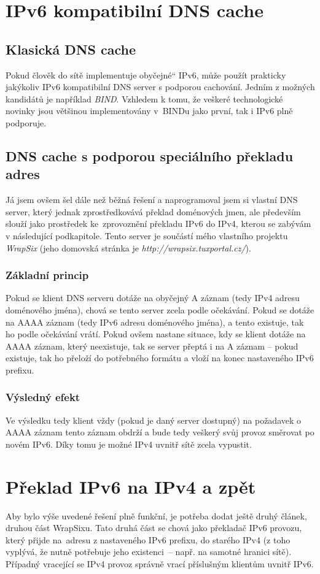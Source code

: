 \documentclass[12pt]{report}
\newcommand\uv[1]{\quotedblbase #1\textquotedblleft}
\begin{document}
\section{IPv6 kompatibilní DNS cache}
\subsection{Klasická DNS cache}
Pokud člověk do sítě implementuje \uv{obyčejné} IPv6, může použít prakticky jakýkoliv IPv6 kompatibilní DNS server s podporou cachování. Jedním z možných kandidátů je například \textit{BIND}. Vzhledem k tomu, že veškeré technologické novinky jsou většinou implementovány v~BINDu jako první, tak i IPv6 plně podporuje.

\subsection{DNS cache s podporou speciálního překladu adres}
Já jsem ovšem šel dále než běžná řešení a naprogramoval jsem si vlastní DNS server, který jednak zprostředkovává překlad doménových jmen, ale především slouží jako prostředek ke~zprovoznění překladu IPv6 do IPv4, kterou se zabývám v následující podkapitole. Tento server je součástí mého vlastního projektu \textit{WrapSix} (jeho domovská stránka je \textit{http://wrapsix.tuxportal.cz/}).

\subsubsection{Základní princip}
Pokud se klient DNS serveru dotáže na obyčejný A záznam (tedy IPv4 adresu doménového jména), chová se tento server zcela podle očekávání. Pokud se dotáže na AAAA záznam (tedy IPv6 adresu doménového jména), a tento existuje, tak ho podle očekávání vrátí. Pokud ovšem nastane situace, kdy se klient dotáže na AAAA záznam, který neexistuje, tak se server přeptá i na A záznam -- pokud existuje, tak ho přeloží do potřebného formátu a vloží na konec nastaveného IPv6 prefixu.

\subsubsection{Výsledný efekt}
Ve výsledku tedy klient vždy (pokud je daný server dostupný) na požadavek o AAAA záznam tento záznam obdrží a bude tedy veškerý svůj provoz směrovat po novém IPv6. Díky tomu je možné IPv4 uvnitř sítě zcela vypustit.

\section{Překlad IPv6 na IPv4 a zpět}
Aby bylo výše uvedené řešení plně funkční, je potřeba dodat ještě druhý článek, druhou část WrapSixu. Tato druhá část se chová jako překladač IPv6 provozu, který přijde na~adresu z nastaveného IPv6 prefixu, do starého IPv4 (z toho vyplývá, že nutně potřebuje jeho existenci~-- např. na samotné hranici sítě). Případný vracející se IPv4 provoz správně vrací příslušným klientům uvnitř IPv6.
\end{document}
